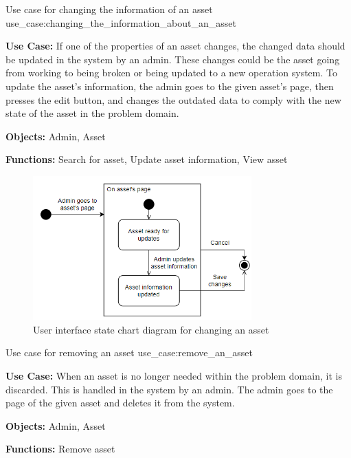     {Use case for changing the information of an asset}
    {use_case:changing_the_information_about_an_asset}
    {
        \textbf{Use Case:} If one of the properties of an asset changes, the changed data should be updated in the system by an admin. These changes could be the asset going from working to being broken or being updated to a new operation system. To update the asset's information, the admin goes to the given asset's page, then presses the edit button, and changes the outdated data to comply with the new state of the asset in the problem domain.
    
        \vskip 0.2cm
        
        \textbf{Objects:} Admin, Asset
        
        \vskip 0.2cm
        
        \textbf{Functions:} Search for asset, Update asset information, View asset
    }
    
\begin{figure}[H]
    \centering
    \includegraphics[width=0.75\textwidth]{figures/UseCases/UpdateAssetUseCase.png}
    \caption{User interface state chart diagram for changing an asset}
    \label{fig:edit_asset_statechart}
\end{figure}

\newpage

    {Use case for removing an asset}
    {use_case:remove_an_asset}
    {
        \textbf{Use Case:} When an asset is no longer needed within the problem domain, it is discarded. This is handled in the system by an admin. The admin goes to the page of the given asset and deletes it from the system.
        \vskip 0.2cm
        
        \textbf{Objects:} Admin, Asset
        
        \vskip 0.2cm
        
        \textbf{Functions:} Remove asset
    }

